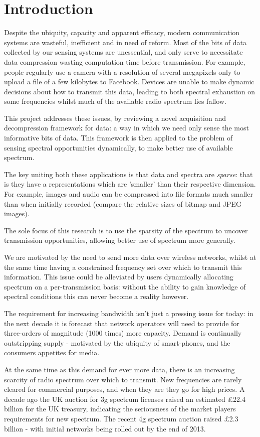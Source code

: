 \section{Introduction}
Despite the ubiquity, capacity and apparent efficacy, modern communication systems are wasteful, inefficient and in need of reform. Most of the bits of data collected by our sensing systems are unessential, and only serve to necessitate data compression wasting computation time before transmission. For example, people regularly use a camera with a resolution of several megapixels only to upload a file of a few kilobytes to Facebook. Devices are unable to make dynamic decisions about how to transmit this data, leading to both spectral exhaustion on some frequencies whilst much of the available radio spectrum lies fallow. 

This project addresses these issues, by reviewing a novel acquisition and decompression framework for data: a way in which we need only sense the most informative bits of data. This framework is then applied to the problem of sensing spectral opportunities dynamically, to make better use of available spectrum. 

The key uniting both these applications is that data and spectra are \textit{sparse}: that is they have a representations which are 'smaller' than their respective dimension. For example, images and audio can be compressed into file formats much smaller than when initially recorded (compare the relative sizes of bitmap and JPEG images).

The sole focus of this research is to use the sparsity of the spectrum to uncover transmission opportunities, allowing better use of spectrum more generally. 

We are motivated by the need to send more data over wireless networks, whilst at the same time having a constrained frequency set over which to transmit this information. This issue could be alleviated by users dynamically allocating spectrum on a per-transmission basis: without the ability to gain knowledge of spectral conditions this can never become a reality however. 

The requirement for increasing bandwidth isn't just a pressing issue for today: in the next decade it is forecast that network operators will need to provide for three-orders of magnitude (1000 times) more capacity. Demand is continually outstripping supply - motivated by the ubiquity of smart-phones, and the consumers appetites for media. 

At the same time as this demand for ever more data, there is an increasing scarcity of radio spectrum over which to transmit. New frequencies are rarely cleared for commercial purposes, and when they are they go for high prices.  A decade ago the UK auction for 3g spectrum licenses raised an estimated £22.4 billion \cite{Ukmobil} for the UK treasury, indicating the seriousness of the market players requirements for new spectrum. The recent 4g spectrum auction raised £2.3 billion \cite{Ukmobi}- with initial networks being rolled out by the end of 2013.

